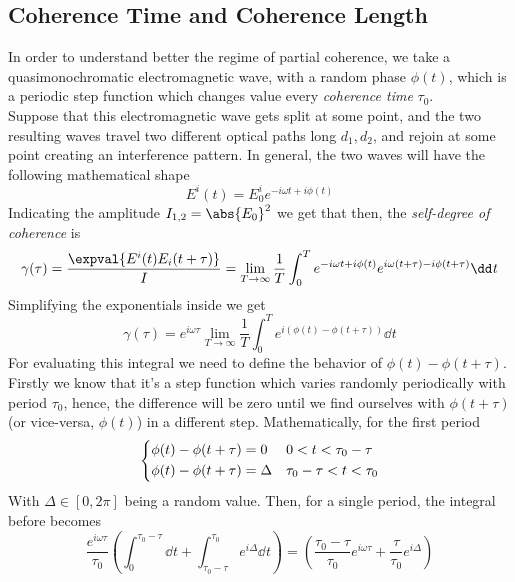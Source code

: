 \documentclass[../electromagnetism.tex]{subfiles}
\begin{document}
\subsection{Coherence Time and Coherence Length}
In order to understand better the regime of partial coherence, we take a quasimonochromatic electromagnetic wave, with a random phase $\phi(t)$, which is a periodic step function which changes value every \textit{coherence time} $\tau_0$.\\
Suppose that this electromagnetic wave gets split at some point, and the two resulting waves travel two different optical paths long $d_1,d_2$, and rejoin at some point creating an interference pattern. In general, the two waves will have the following mathematical shape
\begin{equation*}
	E^i(t)=E_0^ie^{-i\omega t+i\phi(t)}
\end{equation*}
Indicating the amplitude $I_{1,2}=\abs{E_0}^2$ we get that then, the \emph{self-degree of coherence} is 
\begin{equation*}
	\gamma(\tau)=\frac{\expval{E^i(t)E_i(t+\tau)}}{I}=\lim_{T\to\infty}\frac{1}{T}\int_{0}^{T}e^{-i\omega t+i\phi(t)}e^{i\omega(t+\tau)-i\phi(t+\tau)}\dd^{}{t}
\end{equation*}
Simplifying the exponentials inside we get
\begin{equation*}
	\gamma(\tau)=e^{i\omega\tau}\lim_{T\to\infty}\frac{1}{T}\int_{0}^{T}e^{i(\phi(t)-\phi(t+\tau))}\dd^{}{t}
\end{equation*}
For evaluating this integral we need to define the behavior of $\phi(t)-\phi(t+\tau)$. Firstly we know that it's a step function which varies randomly periodically with period $\tau_0$, hence, the difference will be zero until we find ourselves with $\phi(t+\tau)$ (or vice-versa, $\phi(t)$) in a different step. Mathematically, for the first period
\begin{equation*}
	\begin{dcases}
		\phi(t)-\phi(t+\tau)=0&0<t<\tau_0-\tau\\
		\phi(t)-\phi(t+\tau)=\Delta&\tau_0-\tau<t<\tau_0
	\end{dcases}
\end{equation*}
With $\Delta\in[0,2\pi]$ being a random value. Then, for a single period, the integral before becomes
\begin{equation*}
	\frac{e^{i\omega\tau}}{\tau_0}\left( \int_{0}^{\tau_0-\tau}\dd^{}{t}+\int_{\tau_0-\tau}^{\tau_0}e^{i\Delta}\dd^{}{t} \right)=\left( \frac{\tau_0-\tau}{\tau_0}e^{i\omega\tau}+\frac{\tau}{\tau_0}e^{i\Delta} \right)
\end{equation*}
\end{document}
